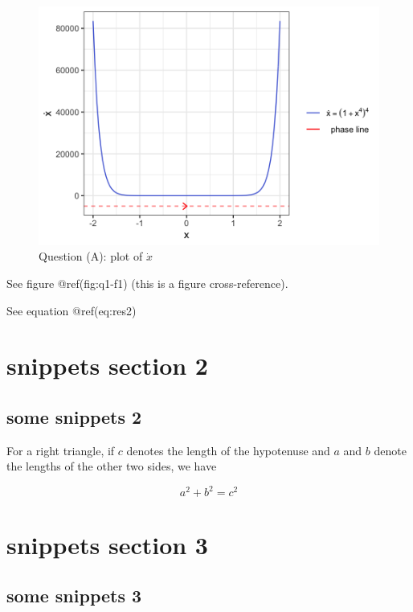 \documentclass[
]{article}
\begin{document}
\begin{figure}
\centering
\includegraphics{figures/q1-f1-1.png}
\caption{Question (A): plot of \(\dot{x}\)}
\end{figure}

See figure @ref(fig:q1-f1) (this is a figure cross-reference).

See equation @ref(eq:res2)

\hypertarget{snippets-section-2}{%
\section{snippets section 2}\label{snippets-section-2}}

\hypertarget{some-snippets-2}{%
\subsection{some snippets 2}\label{some-snippets-2}}

For a right triangle, if \(c\) denotes the length of the hypotenuse and
\(a\) and \(b\) denote the lengths of the other two sides, we have

\[a^2 + b^2 = c^2\]

\hypertarget{snippets-section-3}{%
\section{snippets section 3}\label{snippets-section-3}}

\hypertarget{some-snippets-3}{%
\subsection{some snippets 3}\label{some-snippets-3}}
\end{document}
